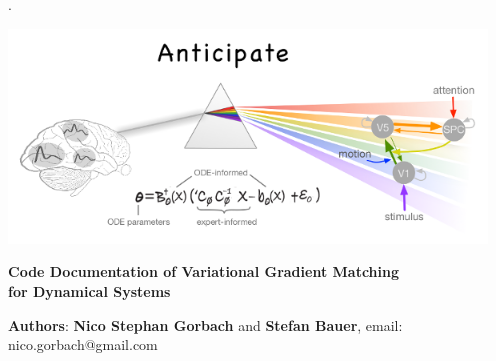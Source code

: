 \begin{center}

{.}
  \vspace{1.2cm}

  \thispagestyle{empty}

\includegraphics[width=5in]{logo.png}
\vspace{0.5cm}  

  {\LARGE\bf Code Documentation of Variational Gradient Matching \\ \vspace{0.3cm} for Dynamical Systems}
  
  \thispagestyle{empty}
             


  \vspace{1.2cm}

\end{center}
\vspace{2cm}
 {\Large \textbf{Authors}:\vspace{0.4cm}
\newline \textbf{Nico Stephan Gorbach} and \textbf{Stefan Bauer}, email: nico.gorbach@gmail.com}

